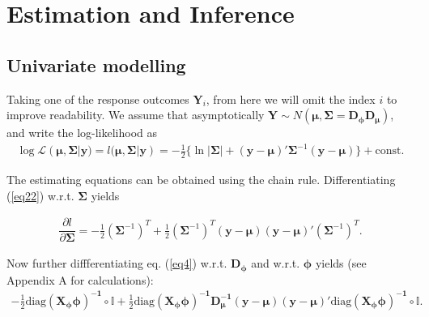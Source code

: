 \documentclass[useAMS,referee]{biom}
\begin{document}
\section{Estimation and Inference}
\subsection{Univariate modelling}\label{univariate}

Taking one of the response outcomes $\mathbf {Y} _i $, from here we will omit the index $ i $ to improve readability. We assume that asymptotically  $\boldsymbol{Y} \sim N({\boldsymbol{\mu}},\boldsymbol{\Sigma}= \mathbf{D_\phi}\mathbf{D_\mu})$, and write the log-likelihood as
\begin{equation}\label{eq22}
\begin{array}{l}
\log \mathcal{L}(\boldsymbol{\mu},\boldsymbol{\Sigma}| \mathbf{y})= l(\boldsymbol{\mu},\boldsymbol{\Sigma}| \mathbf{y})= -\frac{1}{2}\{\ln |\boldsymbol{\Sigma}| +  (\mathbf{y}-\boldsymbol{\mu})'\boldsymbol{\Sigma}^{-1} (\mathbf{y}-\boldsymbol{\mu})\} + \mbox{const.}





\end{array}
\end{equation}

The estimating equations can be obtained using the chain rule. Differentiating (\ref{eq22}) w.r.t. $\boldsymbol{\Sigma}$ yields 

\begin{equation}\label{eq4}
\begin{array}{l}
\dfrac{\partial l}{\partial \boldsymbol{\Sigma}} = -\frac{1}{2}(\boldsymbol{\Sigma}^{-1})^T+\frac{1}{2}(\boldsymbol{\Sigma}^{-1})^T(\mathbf{y}-\boldsymbol{\mu})(\mathbf{y}-\boldsymbol{\mu})'(\boldsymbol{\Sigma}^{-1})^T.

\end{array}
\end{equation}

Now further diffferentiating eq. (\ref{eq4}) w.r.t. $\mathbf{D_\phi}$ and  w.r.t. $\boldsymbol{\phi}$ yields (see Appendix A for calculations):
\begin{equation}\label{eq5}
\begin{array}{l}
-\frac{1}{2}\mbox{diag}\mathbf{ (X_\phi \boldsymbol{\phi})^{-1}}\circ \mathbb{I}+\frac{1}{2}\mbox{diag}\mathbf{ (X_\phi \boldsymbol{\phi})^{-1}D_\mu^{-1}}(\mathbf{y}-\boldsymbol{\mu})(\mathbf{y}-\boldsymbol{\mu})'\mbox{diag}\mathbf{( X_\phi \boldsymbol{\phi})^{-1}}\circ \mathbb{I}.
\end{array}
\end{equation}
\end{document}
